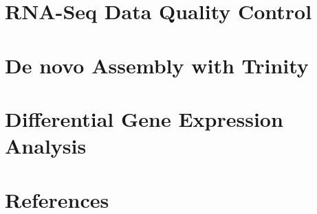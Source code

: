\documentclass[
  letterpaper,
  DIV=11,
  numbers=noendperiod]{scrreprt}
\newlength{\cslhangindent}
\newlength{\cslentryspacingunit} %
\newenvironment{CSLReferences}[2] %
 {%
  \setlength{\parindent}{0pt}
  \ifodd #1
  \let\oldpar\par
  \def\par{\hangindent=\cslhangindent\oldpar}
  \fi
  \setlength{\parskip}{#2\cslentryspacingunit}
 }%
 {}
\begin{document}

\hypertarget{rna-seq-data-quality-control}{%
\chapter{RNA-Seq Data Quality
Control}\label{rna-seq-data-quality-control}}


\hypertarget{de-novo-assembly-with-trinity}{%
\chapter{De novo Assembly with
Trinity}\label{de-novo-assembly-with-trinity}}


\hypertarget{differential-gene-expression-analysis}{%
\chapter{Differential Gene Expression
Analysis}\label{differential-gene-expression-analysis}}


\hypertarget{references}{%
\chapter*{References}\label{references}}


\hypertarget{refs}{}
\begin{CSLReferences}{0}{0}
\end{CSLReferences}
\end{document}
